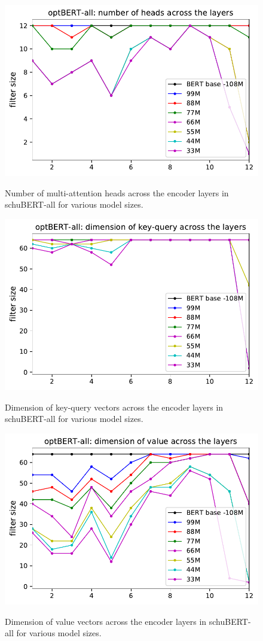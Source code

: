 \documentclass[11pt,a4paper]{article}
\begin{document}
\begin{figure}[h]
 \begin{center}
	\includegraphics[width=0.9\linewidth]{heads.pdf}
	\caption{Number of multi-attention heads across the encoder layers in schuBERT-all for various model sizes. 
	}
	\vspace{-1em}
	\label{fig:heads}
\end{center}
\end{figure}
\begin{figure}[h]
 \begin{center}
	\includegraphics[width=0.9\linewidth]{key-query.pdf}
	\caption{Dimension of key-query vectors across the encoder layers in schuBERT-all for various model sizes.  
	}
	\vspace{-1em}
	\label{fig:key}
\end{center}
\end{figure}
\begin{figure}[h]
 \begin{center}
	\includegraphics[width=0.9\linewidth]{value.pdf}
	\caption{Dimension of value vectors across the encoder layers in schuBERT-all for various model sizes.   
	}
	\vspace{-1em}
	\label{fig:value}
\end{center}
\end{figure}
\end{document}
